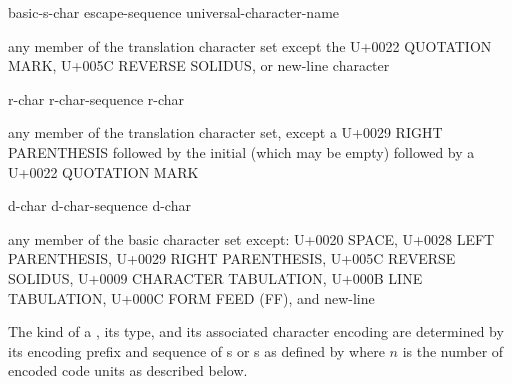 \begin{bnf}
\br
    basic-s-char\br
    escape-sequence\br
    universal-character-name
\end{bnf}

\begin{bnf}
\br
    \textnormal{any member of the translation character set except the U+0022 QUOTATION MARK,}\br
    \bnfindent\textnormal{U+005C REVERSE SOLIDUS, or new-line character}
\end{bnf}

\begin{bnf}
\br
      \terminal{(}  \terminal{)}  
\end{bnf}

\begin{bnf}
\br
    r-char\br
    r-char-sequence r-char
\end{bnf}

\begin{bnf}
\br
    \textnormal{any member of the translation character set, except a U+0029 RIGHT PARENTHESIS followed by}\br
    \bnfindent\textnormal{the initial  (which may be empty) followed by a U+0022 QUOTATION MARK}
\end{bnf}

\begin{bnf}
\br
    d-char\br
    d-char-sequence d-char
\end{bnf}

\begin{bnf}
\br
    \textnormal{any member of the basic character set except:}\br
    \bnfindent\textnormal{U+0020 SPACE, U+0028 LEFT PARENTHESIS, U+0029 RIGHT PARENTHESIS,}\br
    \bnfindent\textnormal{U+005C REVERSE SOLIDUS, U+0009 CHARACTER TABULATION,}\br
    \bnfindent\textnormal{U+000B LINE TABULATION, U+000C FORM FEED (FF), and new-line}
\end{bnf}

\pnum
{}%
%
%
%
%
%
%
%
%
The kind of a ,
its type, and
its associated character encoding
are determined by its encoding prefix and sequence of
s or s
as defined by 
where $n$ is the number of encoded code units as described below.

